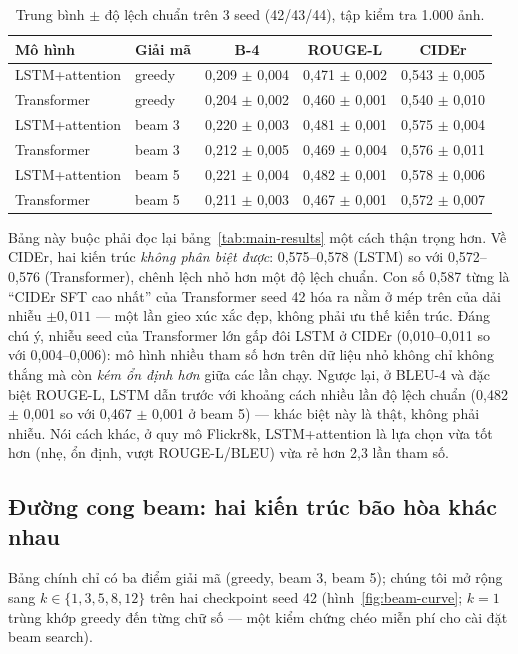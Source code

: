 \begin{table}[H]
	\centering
	\caption{Trung bình $\pm$ độ lệch chuẩn trên 3 seed (42/43/44), tập kiểm
	tra 1.000 ảnh.}
	\label{tab:seeds}
	\begin{tabular}{llccc}
		\hline
		\textbf{Mô hình} & \textbf{Giải mã} & \textbf{B-4} & \textbf{ROUGE-L} & \textbf{CIDEr} \\
		\hline
		LSTM+attention & greedy & 0,209 $\pm$ 0,004 & 0,471 $\pm$ 0,002 & 0,543 $\pm$ 0,005 \\
		Transformer    & greedy & 0,204 $\pm$ 0,002 & 0,460 $\pm$ 0,001 & 0,540 $\pm$ 0,010 \\
		\hline
		LSTM+attention & beam 3 & 0,220 $\pm$ 0,003 & 0,481 $\pm$ 0,001 & 0,575 $\pm$ 0,004 \\
		Transformer    & beam 3 & 0,212 $\pm$ 0,005 & 0,469 $\pm$ 0,004 & 0,576 $\pm$ 0,011 \\
		\hline
		LSTM+attention & beam 5 & 0,221 $\pm$ 0,004 & 0,482 $\pm$ 0,001 & 0,578 $\pm$ 0,006 \\
		Transformer    & beam 5 & 0,211 $\pm$ 0,003 & 0,467 $\pm$ 0,001 & 0,572 $\pm$ 0,007 \\
		\hline
	\end{tabular}
\end{table}

Bảng này buộc phải đọc lại bảng~\ref{tab:main-results} một cách thận trọng
hơn. Về CIDEr, hai kiến trúc \emph{không phân biệt được}: 0,575--0,578 (LSTM)
so với 0,572--0,576 (Transformer), chênh lệch nhỏ hơn một độ lệch chuẩn. Con số
0,587 từng là ``CIDEr SFT cao nhất'' của Transformer seed 42 hóa ra nằm ở mép
trên của dải nhiễu $\pm 0{,}011$ --- một lần gieo xúc xắc đẹp, không phải ưu
thế kiến trúc. Đáng chú ý, nhiễu seed của Transformer lớn gấp đôi LSTM ở CIDEr
(0,010--0,011 so với 0,004--0,006): mô hình nhiều tham số hơn trên dữ liệu nhỏ
không chỉ không thắng mà còn \emph{kém ổn định hơn} giữa các lần chạy. Ngược
lại, ở BLEU-4 và đặc biệt ROUGE-L, LSTM dẫn trước với khoảng cách nhiều lần độ
lệch chuẩn (0,482 $\pm$ 0,001 so với 0,467 $\pm$ 0,001 ở beam 5) --- khác biệt
này là thật, không phải nhiễu. Nói cách khác, ở quy mô Flickr8k, LSTM+attention
là lựa chọn vừa tốt hơn (nhẹ, ổn định, vượt ROUGE-L/BLEU) vừa rẻ hơn 2,3 lần
tham số.

\subsection{Đường cong beam: hai kiến trúc bão hòa khác nhau}

Bảng chính chỉ có ba điểm giải mã (greedy, beam 3, beam 5); chúng tôi mở rộng
sang $k \in \{1, 3, 5, 8, 12\}$ trên hai checkpoint seed 42 (hình~\ref{fig:beam-curve};
$k{=}1$ trùng khớp greedy đến từng chữ số --- một kiểm chứng chéo miễn phí cho
cài đặt beam search).

